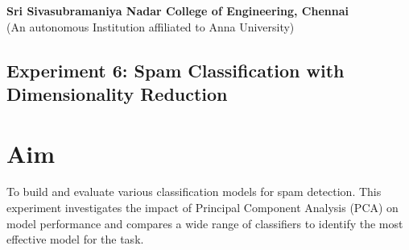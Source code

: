 \documentclass[12pt]{article}
\begin{document}
\begin{center}
    \large \textbf{Sri Sivasubramaniya Nadar College of Engineering, Chennai} \\
    (An autonomous Institution affiliated to Anna University) \\
    \vspace{1cm}
\end{center}

\begin{table}[H]
\renewcommand{\arraystretch}{1.5}
\end{table}

\vspace{1cm}

\begin{center}
 \section*{Experiment 6: Spam Classification with Dimensionality Reduction}
\end{center}

\vspace{1cm}

\section{Aim}
To build and evaluate various classification models for spam detection. This experiment investigates the impact of Principal Component Analysis (PCA) on model performance and compares a wide range of classifiers to identify the most effective model for the task.

\end{document}
